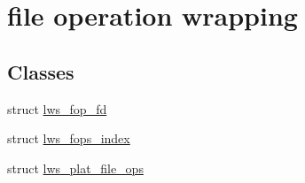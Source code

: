 \hypertarget{group__fops}{}\section{file operation wrapping}
\label{group__fops}
\subsection*{Classes}
\begin{DoxyCompactItemize}
\item 
struct \hyperlink{structlws__fop__fd}{lws\+\_\+fop\+\_\+fd}
\item 
struct \hyperlink{structlws__fops__index}{lws\+\_\+fops\+\_\+index}
\item 
struct \hyperlink{structlws__plat__file__ops}{lws\+\_\+plat\+\_\+file\+\_\+ops}
\end{DoxyCompactItemize}
